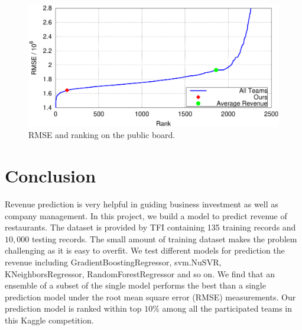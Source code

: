 \documentclass[10pt, oneside]{article}   	%
\begin{document}
\begin{figure}[h]
   \centering
   \includegraphics[width=5in]{figs/pb.eps} 
   \caption{RMSE and ranking on the public board.}
   \label{fig:pb}
\end{figure}



\section{Conclusion} 
Revenue prediction is very helpful in guiding business investment as well as company management. In this project, we build a model to predict revenue of restaurants. The dataset is provided by TFI containing 135 training records and $10,000$ testing records. The small amount of training dataset makes the problem challenging as it is easy to overfit. We test different models for prediction the revenue including GradientBoostingRegressor, svm.NuSVR, KNeighborsRegressor, RandomForestRegressor and so on. We find that an ensemble of a subset of the single model performs the best than a single prediction model under the root mean square error (RMSE) measurements. Our prediction model is ranked within top $10\%$ among all the participated teams in this Kaggle competition.
\end{document}
